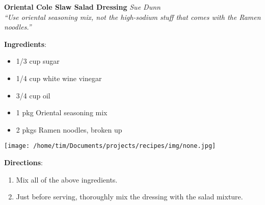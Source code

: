\documentclass[11pt, twoside, openany]{book}
\begin{document}
\noindent\begin{minipage}[t]{\linewidth}%
{\Large\textbf{Oriental Cole Slaw Salad Dressing}} \label{oriental-cole-slaw-salad-dressing}\hfill\textit{Sue Dunn}\\
\textit{``Use oriental seasoning mix, not the high-sodium stuff that comes with the Ramen noodles.''}\\
\noindent\begin{minipage}[t]{0.78\linewidth}%
\textbf{Ingredients}:\vspace{-3mm}
\begin{multicols}{2}
\begin{itemize}\setlength\itemsep{-1mm}
\item 1/3 cup sugar
\item 1/4 cup white wine vinegar
\item 3/4 cup oil
\item 1 pkg Oriental seasoning mix
\item 2 pkgs Ramen noodles, broken up
\end{itemize}
\end{multicols}
\end{minipage}
\noindent\begin{minipage}[t]{0.18\linewidth}
\centering \strut\vspace*{-\baselineskip}\newline
\texttt{[image: /home/tim/Documents/projects/recipes/img/none.jpg]}\\
\end{minipage}\vspace{3mm}
\textbf{Directions}:
\vspace{-3mm}\begin{enumerate}\setlength\itemsep{-1mm}
\item Mix all of the above ingredients.
\item Just before serving, thoroughly mix the dressing with the salad mixture.
\end{enumerate}
\end{minipage}\vspace{8mm}
\end{document}
